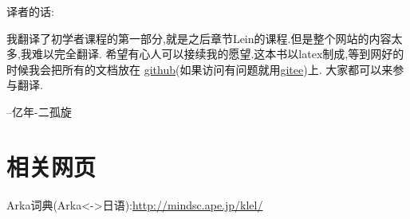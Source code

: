\small{
译者的话:

我翻译了初学者课程的第一部分,就是之后章节Lein的课程.但是整个网站的内容太多,我难以完全翻译.
希望有心人可以接续我的愿望.这本书以latex制成,等到网好的时候我会把所有的文档放在
\href{https://github.com/HOMODELUNA/arka-book-cn}{github}(如果访问有问题就用\href{https://gitee.com/HOMODELUNA/arka-book-cn}{gitee})上.
大家都可以来参与翻译.

\quad --亿年-二孤旋
}
\section{相关网页}


Arka词典(Arka<->日语):\url{http://mindsc.ape.jp/klel/}
